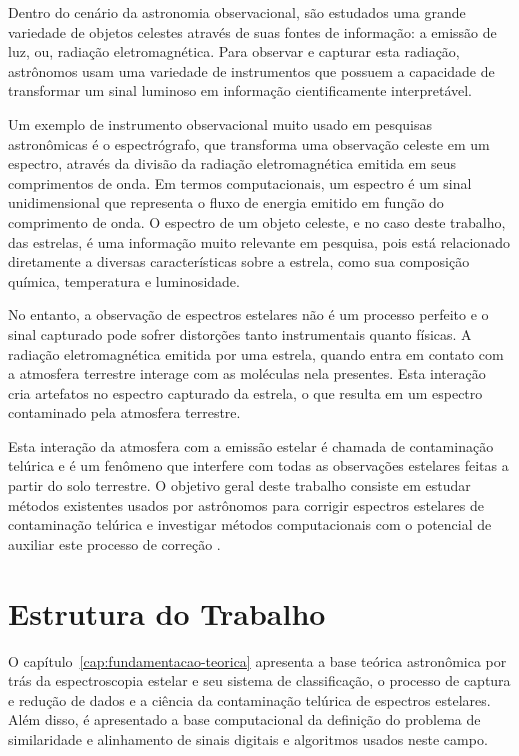 Dentro do cenário da astronomia observacional, são estudados uma grande variedade de objetos celestes através de suas fontes de informação: a emissão de luz, ou, radiação eletromagnética. Para observar e capturar esta radiação, astrônomos usam uma variedade de instrumentos que possuem a capacidade de transformar um sinal luminoso em informação cientificamente interpretável.

Um exemplo de instrumento observacional muito usado em pesquisas astronômicas é o espectrógrafo, que transforma uma observação celeste em um espectro, através da divisão da radiação eletromagnética emitida em seus comprimentos de onda. Em termos computacionais, um espectro é um sinal unidimensional que representa o fluxo de energia emitido em função do comprimento de onda. O espectro de um objeto celeste, e no caso deste trabalho, das estrelas, é uma informação muito relevante em pesquisa, pois está relacionado diretamente a diversas características sobre a estrela, como sua composição química, temperatura e luminosidade.

No entanto, a observação de espectros estelares não é um processo perfeito e o sinal capturado pode sofrer distorções tanto instrumentais quanto físicas. A radiação eletromagnética emitida por uma estrela, quando entra em contato com a atmosfera terrestre interage com as moléculas nela presentes. Esta interação cria artefatos no espectro capturado da estrela, o que resulta em um espectro contaminado pela atmosfera terrestre. 

Esta interação da atmosfera com a emissão estelar é chamada de contaminação telúrica e é um fenômeno que interfere com todas as observações estelares feitas a partir do solo terrestre. O objetivo geral deste trabalho consiste em estudar métodos existentes usados por astrônomos para corrigir espectros estelares de contaminação telúrica e investigar métodos computacionais com o potencial de auxiliar este processo de correção .


\section{Estrutura do Trabalho}

O capítulo~\ref{cap:fundamentacao-teorica} apresenta a base teórica astronômica por trás da espectroscopia estelar e seu sistema de classificação, o processo de captura e redução de dados e a ciência da contaminação telúrica de espectros estelares. Além disso, é apresentado a base computacional da definição do problema de similaridade e alinhamento de sinais digitais e algoritmos usados neste campo.

